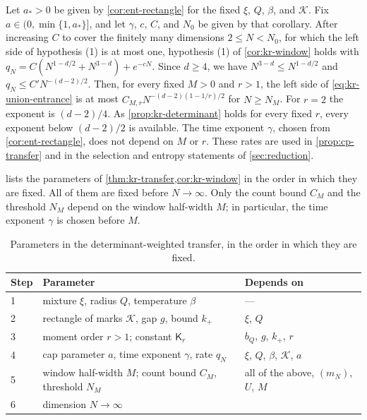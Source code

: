 \begin{remark}\label{rem:kr-rates}
Let $a_*>0$ be given by \cref{cor:ent-rectangle} for the fixed $\xi$, $Q$, $\beta$, and $\mathcal K$. Fix $a\in(0,\min\{1,a_*\}]$, and let $\gamma$, $c$, $C$, and $N_0$ be given by that corollary. After increasing $C$ to cover the finitely many dimensions $2\le N<N_0$, for which the left side of hypothesis (1) is at most one, hypothesis (1) of \cref{cor:kr-window} holds with $q_N=C(N^{1-d/2}+N^{3-d})+e^{-cN}$. Since $d\ge4$, we have $N^{3-d}\le N^{1-d/2}$ and $q_N\le C'N^{-(d-2)/2}$. Then, for every fixed $M>0$ and $r>1$, the left side of \eqref{eq:kr-union-entrance} is at most $C_{M,r}N^{-(d-2)(1-1/r)/2}$ for $N\ge N_M$. For $r=2$ the exponent is $(d-2)/4$. As \cref{prop:kr-determinant} holds for every fixed $r$, every exponent below $(d-2)/2$ is available. The time exponent $\gamma$, chosen from \cref{cor:ent-rectangle}, does not depend on $M$ or $r$. These rates are used in \cref{prop:cp-transfer} and in the selection and entropy statements of \cref{sec:reduction}.
\end{remark}

\begin{remark}\label{rem:kr-order}
 lists the parameters of \cref{thm:kr-transfer,cor:kr-window} in the order in which they are fixed. All of them are fixed before $N\to\infty$. Only the count bound $C_M$ and the threshold $N_M$ depend on the window half-width $M$; in particular, the time exponent $\gamma$ is chosen before $M$.
\end{remark}

\begin{table}[ht]
\centering
\small
\caption{Parameters in the determinant-weighted transfer, in the order in which they are fixed.}\label{tab:kr-order}
\begin{tabular}{@{}lll@{}}
\toprule
Step & Parameter & Depends on\\
\midrule
1 & mixture $\xi$, radius $Q$, temperature $\beta$ & ---\\
2 & rectangle of marks $\mathcal K$, gap $g$, bound $k_+$ & $\xi$, $Q$\\
3 & moment order $r>1$; constant $\mathsf K_r$ & $b_Q$, $g$, $k_+$, $r$\\
4 & cap parameter $a$, time exponent $\gamma$, rate $q_N$ & $\xi$, $Q$, $\beta$, $\mathcal K$, $a$\\
5 & window half-width $M$; count bound $C_M$, threshold $N_M$ & all of the above, $(m_N)$, $U$, $M$\\
6 & dimension $N\to\infty$ & \\
\bottomrule
\end{tabular}
\end{table}
